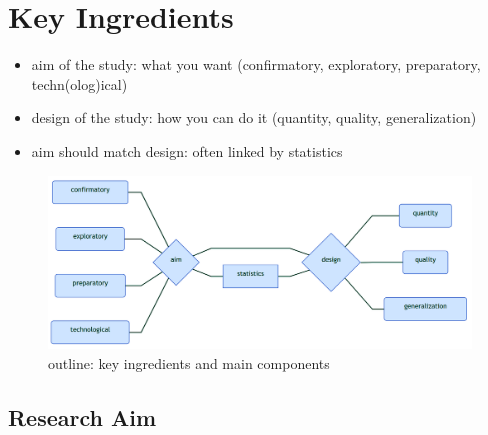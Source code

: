 \documentclass[]{article}
\providecommand{\tightlist}{%
  \setlength{\itemsep}{0pt}\setlength{\parskip}{0pt}}
\begin{document}
\section{Key Ingredients}\label{key-ingredients}

\begin{itemize}
\tightlist
\item
  aim of the study: what you want (confirmatory, exploratory,
  preparatory, techn(olog)ical)
\item
  design of the study: how you can do it (quantity, quality,
  generalization)
\item
  aim should match design: often linked by statistics 
\end{itemize}

\begin{figure}[htbp]
\centering
\includegraphics{diagrammeR.png}
\caption{outline: key ingredients and main components}
\end{figure}

\newpage

\subsection{Research Aim}\label{research-aim}
\end{document}
